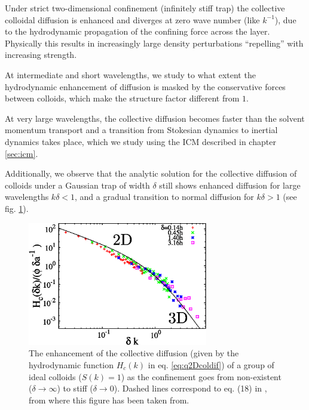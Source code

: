 \documentclass[ twoside,openright,titlepage,numbers=noenddot,%
headinclude,footinclude,cleardoublepage=empty,abstract=on,
BCOR=5mm,paper=a4,fontsize=11pt, dvipsnames
]{scrreprt}
\begin{document}
  Under strict two-dimensional confinement (infinitely stiff trap) the collective colloidal diffusion is enhanced and diverges at zero wave number (like $k^{-1}$), due to the hydrodynamic propagation of the confining force across the layer. Physically this results in increasingly large density perturbations ``repelling'' with increasing strength.
  

  At intermediate and short wavelengths, we study to what extent the hydrodynamic enhancement of diffusion is masked by the conservative forces between colloids, which make the structure factor different from $1$. 
  
  At very large wavelengths, the collective diffusion becomes faster than the solvent momentum transport and a transition from Stokesian dynamics to inertial dynamics takes place, which we study using the \gls{ICM} described in chapter \ref{sec:icm}.

  Additionally, we observe that the analytic solution for the collective diffusion of colloids under a Gaussian trap of width $\delta$ still shows enhanced diffusion for large wavelengths $k\delta < 1$, and a gradual transition to normal diffusion for $k\delta > 1$ (see fig. \ref{fig:q2Dfrom3dto2d}).

  \begin{figure}[H]
    \label{fig:q2Dfrom3dto2d}
    \centering
    \includegraphics[width=0.7\textwidth]{gfx/q2Dfrom3dto2d}
    \caption{The enhancement of the collective diffusion (given by the hydrodynamic function $H_c(k)$ in eq. \ref{eq:q2Dcoldif}) of a group of ideal colloids ($S(k)=1$) as the confinement goes from non-existent ($\delta\rightarrow \infty$) to stiff ($\delta\rightarrow 0$). Dashed lines correspond to eq. (18) in \cite{Pelaez2017}, from where this figure has been taken from.}
  \end{figure}

\end{document}
